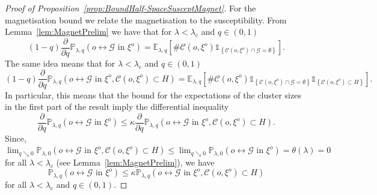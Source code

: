 \documentclass[10pt,a4paper,dvipsnames]{article}
\theoremstyle{definition}
\theoremstyle{remark}
\newcommand{\plaq}{\mathbb{P}_{\lambda,q}}
\newcommand{\elaq}{\mathbb E_{\lambda,q}}
\newcommand{\C}{\mathscr {C}}
\newcommand{\Gcal}{\mathcal{G}}
\newcommand{\conn}[3]{#1 \longleftrightarrow #2\textrm { in } #3}
\newcommand{\Id}{\mathds 1}
\newcommand{\orig}{o}
\numberwithin{equation}{section}
\begin{document}
\begin{proof}[Proof of Proposition~\ref{prop:BoundHalf-SpaceSusceptMagnet}]
    For the magnetisation bound we relate the magnetisation to the susceptibility. From Lemma~\ref{lem:MagnetPrelim} we have that for $\lambda<\lambda_\mathrm{c}$ and $q\in\left(0,1\right)$
    \begin{equation}
        \left(1-q\right)\frac{\partial}{\partial q}\plaq\left(\conn{\orig}{\Gcal}{\xi^\orig}\right) = \elaq\left[\#\C\left(\orig,\xi^\orig\right)\Id_{\left\{\C\left(\orig,\xi^\orig\right)\cap\Gcal=\emptyset\right\}}\right].
    \end{equation}
    The same idea means that for $\lambda<\lambda_\mathrm{c}$ and $q\in\left(0,1\right)$
    \begin{equation}
        \left(1-q\right)\frac{\partial}{\partial q}\plaq\left(\conn{\orig}{\Gcal}{\xi^\orig},\C\left(\orig,\xi^\orig\right)\subset H\right) = \elaq\left[\#\C\left(\orig,\xi^\orig\right)\Id_{\left\{\C\left(\orig,\xi^\orig\right)\cap\Gcal=\emptyset\right\}}\Id_{\left\{\C\left(\orig,\xi^\orig\right)\subset H\right\}}\right].
    \end{equation}
    In particular, this means that the bound for the expectations of the cluster sizes in the first part of the result imply the differential inequality
    \begin{equation}
        \frac{\partial}{\partial q}\plaq\left(\conn{\orig}{\Gcal}{\xi^\orig}\right) \leq \kappa \frac{\partial}{\partial q}\plaq\left(\conn{\orig}{\Gcal}{\xi^\orig},\C\left(\orig,\xi^\orig\right)\subset H\right).
    \end{equation}
    Since, $\lim_{q\searrow 0}\mathbb{P}_{\lambda,0}\left(\conn{\orig}{\Gcal}{\xi^\orig},\C\left(\orig,\xi^\orig\right)\subset H\right) \leq \lim_{q\searrow 0}\mathbb{P}_{\lambda,0}\left(\conn{\orig}{\Gcal}{\xi^\orig}\right) = \theta\left(\lambda\right)=0$ for all $\lambda<\lambda_c$ (see Lemma~\ref{lem:MagnetPrelim}), we have
    \begin{equation}
        \plaq\left(\conn{\orig}{\Gcal}{\xi^\orig}\right) \leq \kappa \plaq\left(\conn{\orig}{\Gcal}{\xi^\orig},\C\left(\orig,\xi^\orig\right)\subset H\right)
    \end{equation}
    for all $\lambda<\lambda_\mathrm{c}$ and $q\in\left(0,1\right)$.
\end{proof}
\end{document}
